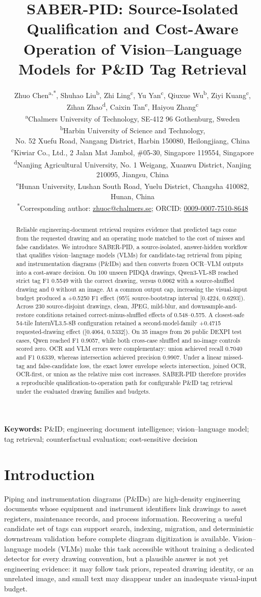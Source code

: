 \documentclass[11pt]{article}
\title{SABER-PID: Source-Isolated Qualification and Cost-Aware Operation of Vision--Language Models for P\&ID Tag Retrieval}
\author{%
Zhuo Chen\textsuperscript{a,*}, Shuhao Liu\textsuperscript{b},
Zhi Ling\textsuperscript{c}, Yu Yan\textsuperscript{c},
Qiuxue Wu\textsuperscript{b}, Ziyi Kuang\textsuperscript{c},\\
Zihan Zhao\textsuperscript{d}, Caixin Tan\textsuperscript{e},
Haiyou Zhang\textsuperscript{c}\\[0.45em]
\small \textsuperscript{a}Chalmers University of Technology,
SE-412 96 Gothenburg, Sweden\\
\small \textsuperscript{b}Harbin University of Science and Technology,\\
\small No. 52 Xuefu Road, Nangang District, Harbin 150080,
Heilongjiang, China\\
\small \textsuperscript{c}Kiwiar Co., Ltd., 2 Jalan Mat Jambol,
\#05-30, Singapore 119554, Singapore\\
\small \textsuperscript{d}Nanjing Agricultural University, No. 1 Weigang,
Xuanwu District, Nanjing 210095, Jiangsu, China\\
\small \textsuperscript{e}Hunan University, Lushan South Road, Yuelu District,
Changsha 410082, Hunan, China\\[0.35em]
\small \textsuperscript{*}Corresponding author:
\href{mailto:zhuoc@chalmers.se}{zhuoc@chalmers.se};
ORCID: \href{https://orcid.org/0009-0007-7510-8648}{0009-0007-7510-8648}%
}
\date{}
\begin{document}
\maketitle

\begin{abstract}
Reliable engineering-document retrieval requires evidence that predicted tags
come from the requested drawing and an operating mode matched to the cost of
misses and false candidates. We introduce SABER-PID, a source-isolated,
answer-hidden workflow that qualifies vision--language models (VLMs) for
candidate-tag retrieval from piping and instrumentation diagrams (P\&IDs) and
then converts frozen OCR--VLM outputs into a cost-aware decision. On 100 unseen
PIDQA drawings, Qwen3-VL-8B reached strict tag F1 0.5549 with the correct
drawing, versus 0.0062 with a source-shuffled drawing and 0 without an image.
At a common output cap, increasing the visual-input budget produced a +0.5250
F1 effect (95\% source-bootstrap interval [0.4224, 0.6293]). Across 230
source-disjoint drawings, clean, JPEG, mild-blur, and downsample-and-restore
conditions retained correct-minus-shuffled effects of 0.548--0.575. A
closest-safe 54-tile InternVL3.5-8B configuration retained a second-model-family
+0.4715 requested-drawing effect ([0.4064, 0.5332]). On 35 images from 26
public DEXPI test cases, Qwen reached F1 0.9057, while both cross-case shuffled
and no-image controls scored zero. OCR and VLM errors were complementary:
union achieved recall 0.7040 and F1 0.6339, whereas intersection achieved
precision 0.9907. Under a linear missed-tag and false-candidate loss, the
exact lower envelope selects intersection, joined OCR, OCR-first, or union as
the relative miss cost increases. SABER-PID therefore provides a reproducible
qualification-to-operation path for configurable P\&ID tag retrieval under
the evaluated drawing families and budgets.
\end{abstract}

\noindent\textbf{Keywords:} P\&ID; engineering document intelligence;
vision--language model; tag retrieval; counterfactual evaluation;
cost-sensitive decision

\section{Introduction}

Piping and instrumentation diagrams (P\&IDs) are high-density engineering
documents whose equipment and instrument identifiers link drawings to asset
registers, maintenance records, and process information. Recovering a useful
candidate set of tags can support search, indexing, migration, and
deterministic downstream validation before complete diagram digitization is
available. Vision--language models (VLMs) make this task accessible without
training a dedicated detector for every drawing convention, but a plausible
answer is not yet engineering evidence: it may follow task priors, repeated
drawing identity, or an unrelated image, and small text may disappear under
an inadequate visual-input budget.
\end{document}
